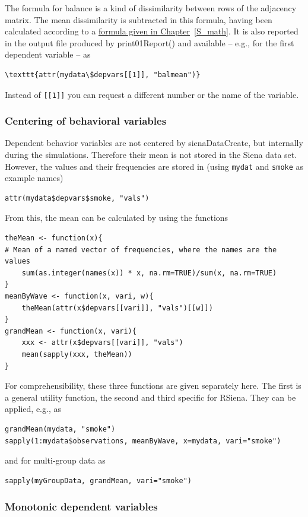 \documentclass[a4paper,fleqn,11pt]{article}
\newcommand{\+}{\, + \,}
\newcommand{\sfn}[1]{\textsf{#1}}
\newcommand{\rs}{{\sf RSiena}}
\begin{document}
The formula for balance is a kind of dissimilarity between rows of
the adjacency matrix. The mean dissimilarity is subtracted in this
formula, having been calculated according to a
\hyperlink{T_meanbal}{formula given in Chapter}~\ref{S_math}.
It is also reported in the
 output file produced by \sfn{print01Report()} and available -- e.g., for the first
dependent variable -- as
\begin{verbatim}
\texttt{attr(mydata\$depvars[[1]], "balmean")}
\end{verbatim}
Instead of \texttt{[[1]]} you can request a different number or
the name of the variable.


\subsubsection{Centering of behavioral variables}

Dependent behavior variables are not centered by \sfn{sienaDataCreate},
but internally during the simulations.
Therefore their mean is not stored in the Siena data set.
However, the values and their frequencies are stored in
(using \texttt{mydat} and \texttt{smoke} as example names)
\begin{verbatim}
attr(mydata$depvars$smoke, "vals")
\end{verbatim}
From this, the mean can be calculated by using the functions
\begin{verbatim}
theMean <- function(x){
# Mean of a named vector of frequencies, where the names are the values
    sum(as.integer(names(x)) * x, na.rm=TRUE)/sum(x, na.rm=TRUE)
}
meanByWave <- function(x, vari, w){
    theMean(attr(x$depvars[[vari]], "vals")[[w]])
}
grandMean <- function(x, vari){
    xxx <- attr(x$depvars[[vari]], "vals")
    mean(sapply(xxx, theMean))
}
\end{verbatim}
For comprehensibility, these three functions are given separately here.
The first is a general utility function, the second and third specific for \rs.
They can be applied, e.g., as
\begin{verbatim}
grandMean(mydata, "smoke")
sapply(1:mydata$observations, meanByWave, x=mydata, vari="smoke")
\end{verbatim}
and for multi-group data as
\begin{verbatim}
sapply(myGroupData, grandMean, vari="smoke")
\end{verbatim}





\subsubsection{Monotonic dependent variables}
\label{S_monotone}
\end{document}
